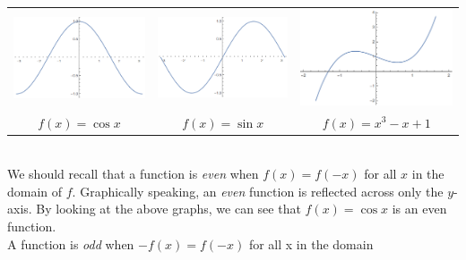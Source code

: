 \documentclass{article}
\begin{document}
\begin{center}
\begin{tabular}{c c c}
\includegraphics[scale=0.4]{cos_eo} & \includegraphics[scale=0.4]{sin_eo} & \includegraphics[scale=0.4]{cube_eo}\\
$f(x) = \cos{x}$ & $f(x) = \sin{x}$ & $f(x) = x^{3}-x +1$
\end{tabular}
\end{center}
\noindent\\
\indent We should recall that a function is \textit{even} when $f(x) = f(-x)$
for all $x$ in the domain of $f$. Graphically speaking, an \textit{even}
function is reflected across only the $y$-axis. By looking at the above graphs,
we can see that $f(x) = \cos{x}$ is an even function.\\
\indent A function is \textit{odd} when $-f(x) = f(-x)$ for all x in the domain
\end{document}
